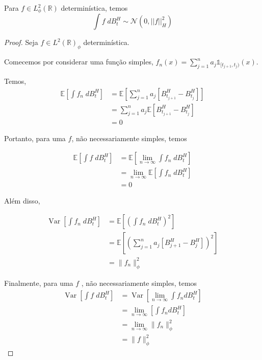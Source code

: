 \documentclass{article}
\begin{document}
\begin{prop}
    Para $f \in L^2_\phi(\mathbb{R})$ determinística, temos 
    $$\int f \; dB_t^H \sim \mathcal{N}(0,||f||^2_H)$$
\end{prop}
\begin{proof}

    
    Seja $f \in L^2(\mathbb{R})_\phi$ determinística.

    Comecemos por considerar uma função simples, $f_n(x)=\sum_{j=1}^n a_j \mathds{1}_{[t_{j+1},t_j)}(x)$.
    
    Temos,  
    \begin{align*}
        \mathbb{E} \left[ \int f_n\; dB^H_t \right] &= \mathbb{E} \left[\sum_{j=1}^n a_j[B^H_{t_{j+1}}-B^H_{t_j}] \right]\\
                                                    &= \sum_{j=1}^n a_j\mathbb{E}[B^H_{t_{j+1}}-B^H_{t_j}]\\
                                                    &= 0
    \end{align*}

    Portanto, para uma $f$, não necessariamente simples, temos

    \begin{align*}
        \mathbb{E} \left[ \int f\; dB^H_t \right] &= \mathbb{E} \left[  \lim_{n \rightarrow \infty} \int f_n\; dB_t^H \right]\\
                                                  &= \lim_{n \rightarrow \infty} \mathbb{E} \left[ \int f_n \; dB_t^H \right]\\
                                                  &= 0
    \end{align*}


    Além disso, 

    \begin{align*}
        \operatorname{Var} \left[ \int f_n\; dB^H_t \right] &= \mathbb{E}\left[ \left(\int f_n\; dB^H_t \right)^2 \right] \\
                                                            &= \mathbb{E} \left[\left( \sum_{j=1}^na_j[B^H_{j+1}-B^H_{j}] \right)^2 \right]\\
                                                            &=\|f_n\|_\phi^2
    \end{align*}

    Finalmente, para uma $f$ , não necessariamente simples, temos
    \begin{align*}
        \operatorname{Var} \left[ \int f\; dB^H_t \right] &= \operatorname{Var} \left[ \lim_{n \rightarrow \infty} \int f_n dB_t^H \right]\\
                                                          &=\lim_{n \rightarrow \infty} \left[ \int f_n dB_t^H \right]\\
                                                          &=\lim_{n \rightarrow \infty} \| f_n \|_\phi^2\\
                                                          &=\|f\|^2_\phi
    \end{align*}
    

\end{proof}
\end{document}
